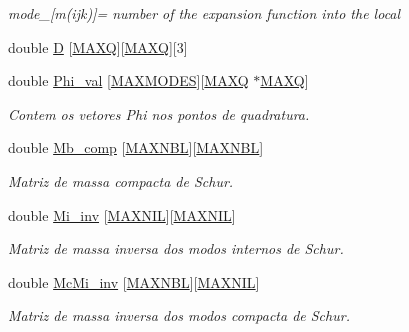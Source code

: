 \begin{DoxyCompactItemize}
\begin{DoxyCompactList}\small\item\em mode\+\_\+\mbox{[}m(ijk)\mbox{]}= number of the expansion function into the local \end{DoxyCompactList}\item 
double \hyperlink{classStdel_a61f02fa483b00cb98ff5c8d951068211}{D} \mbox{[}\hyperlink{MyOptions_8h_af708e94d886ba3f59582612949cac702}{M\+A\+XQ}\mbox{]}\mbox{[}\hyperlink{MyOptions_8h_af708e94d886ba3f59582612949cac702}{M\+A\+XQ}\mbox{]}\mbox{[}3\mbox{]}
\item 
double \hyperlink{classStdel_ab7849f154bd766857aac9557c19f7f84}{Phi\+\_\+val} \mbox{[}\hyperlink{MyOptions_8h_aa75ccd382acf88cec3e9c8025c1f88b7}{M\+A\+X\+M\+O\+D\+ES}\mbox{]}\mbox{[}\hyperlink{MyOptions_8h_af708e94d886ba3f59582612949cac702}{M\+A\+XQ} $\ast$\hyperlink{MyOptions_8h_af708e94d886ba3f59582612949cac702}{M\+A\+XQ}\mbox{]}
\begin{DoxyCompactList}\small\item\em Contem os vetores Phi nos pontos de quadratura. \end{DoxyCompactList}\item 
double \hyperlink{classStdel_aa1627cb39fa5da75764809412159c825}{Mb\+\_\+comp} \mbox{[}\hyperlink{MyOptions_8h_aed8828a63ec0a2a0461b7c9ed39dd648}{M\+A\+X\+N\+BL}\mbox{]}\mbox{[}\hyperlink{MyOptions_8h_aed8828a63ec0a2a0461b7c9ed39dd648}{M\+A\+X\+N\+BL}\mbox{]}
\begin{DoxyCompactList}\small\item\em Matriz de massa compacta de Schur. \end{DoxyCompactList}\item 
double \hyperlink{classStdel_a53a9490d5a02a96473d96848bac3711a}{Mi\+\_\+inv} \mbox{[}\hyperlink{MyOptions_8h_a463cdf068fb6289d1f81dac7e0f76ab5}{M\+A\+X\+N\+IL}\mbox{]}\mbox{[}\hyperlink{MyOptions_8h_a463cdf068fb6289d1f81dac7e0f76ab5}{M\+A\+X\+N\+IL}\mbox{]}
\begin{DoxyCompactList}\small\item\em Matriz de massa inversa dos modos internos de Schur. \end{DoxyCompactList}\item 
double \hyperlink{classStdel_acc685141e80bcce9703e37f32cc5c42c}{Mc\+Mi\+\_\+inv} \mbox{[}\hyperlink{MyOptions_8h_aed8828a63ec0a2a0461b7c9ed39dd648}{M\+A\+X\+N\+BL}\mbox{]}\mbox{[}\hyperlink{MyOptions_8h_a463cdf068fb6289d1f81dac7e0f76ab5}{M\+A\+X\+N\+IL}\mbox{]}
\begin{DoxyCompactList}\small\item\em Matriz de massa inversa dos modos compacta de Schur. \end{DoxyCompactList}\item 

\end{DoxyCompactItemize}
